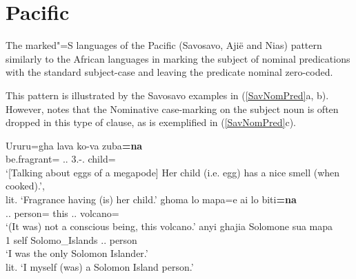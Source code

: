 
\section{Pacific}\label{NomPredPac}

The marked"=S languages of the Pacific (Savosavo, Aji\"e and Nias) pattern similarly to the African languages in marking the subject of nominal predications with the standard subject-case and leaving the predicate nominal zero-coded. 

This pattern is illustrated by the Savosavo examples in (\ref{SavNomPred}a, b). 
However, \citet[212]{Wegener:2008} notes that the Nominative case-marking on the subject noun is often dropped in this type of clause, as is exemplified in (\ref{SavNomPred}c). 

\begin{exe}\ex\label{SavNomPred}
\begin{xlist}
\ex\gll Ururu=gha lava ko-va zuba\textbf{=na}\\
be.fragrant=\pl{} \propr{}.\sg{}.\mas{} 3\sg{}.\fem{}-\gen{}.\mas{} child=\nom{}\\
\glt `[Talking about eggs of a megapode] Her child (i.e. egg) has a nice smell (when
cooked).',\\
lit. `Fragrance having (is) her child.'
\ex\gll ghoma lo mapa=e  ai lo biti\textbf{=na}\\
\Neg{} \deter{}.\sg{}.\mas{} person=\emphat{} this \deter{}.\sg{}.\mas{} volcano=\nom{}\\
\glt `(It was) not a conscious being, this volcano.'
\ex\gll  anyi ghajia Solomone sua mapa\\
1\sg{} self Solomo\_Islands \att{}.\sg{}.\mas{} person\\
\glt `I was the only Solomon Islander.'\\
lit. `I myself (was) a Solomon Island person.'
\end{xlist}
\end{exe}

